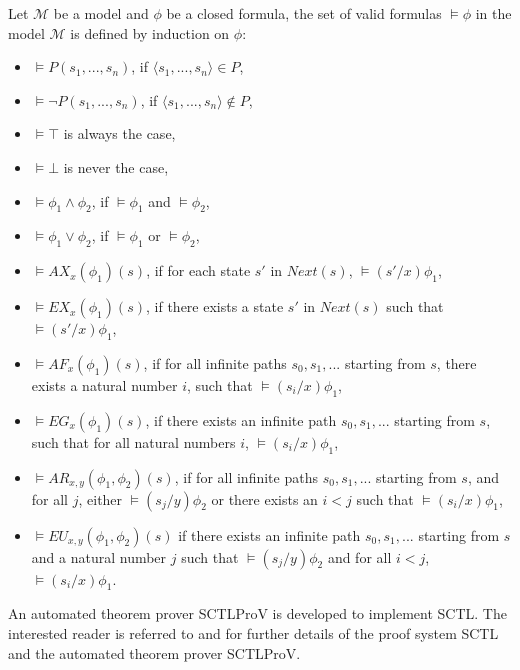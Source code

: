 \documentclass[runningheads]{llncs}
\begin{document}
\begin{definition}
Let $\mathcal{M}$ be a model and $\phi$ be a closed formula, the set of valid formulas $\models \phi$ in the model $\mathcal{M}$ is defined by induction on $\phi$:
 
\begin{itemize}
        \item $\models P(s_1,...,s_n)$, if $\langle s_1,...,s_n\rangle \in P$,
        \item $\models \neg P(s_1,...,s_n)$, if $\langle s_1,...,s_n\rangle \notin P$,
        \item $\models \top$ is always the case, 
        \item $\models \bot$ is never the case,
        \item $\models \phi_1\wedge\phi_2$, if $\models \phi_1$ and $\models \phi_2$,
        \item $\models \phi_1\vee\phi_2$, if $\models \phi_1$ or $\models \phi_2$,
        \item $\models AX_x(\phi_1)(s)$, if for each state $s'$ in $Next(s)$, $\models (s'/x)\phi_1$,
        \item $\models EX_x(\phi_1)(s)$, if there exists a state $s'$ in $Next(s)$ such that $\models (s'/x)\phi_1$,
        \item $\models AF_x(\phi_1)(s)$, if for all infinite paths $s_0,s_1,...$ starting from $s$, there exists a natural number $i$, such that $\models (s_i/x)\phi_1$,
        \item $\models EG_x(\phi_1)(s)$, if there exists an infinite path $s_0,s_1,...$ starting from $s$, such that for all natural numbers $i$, $\models (s_i/x)\phi_1$,
        \item $\models AR_{x, y}(\phi_1,\phi_2)(s)$, if for all infinite paths $s_0,s_1,...$ starting from $s$, and for all $j$, either $\models (s_j/y)\phi_2$ or there exists an $i<j$ such that $\models (s_i/x)\phi_1$,
        \item $\models EU_{x, y}(\phi_1,\phi_2)(s)$ if there exists an infinite path $s_0,s_1,...$ starting from $s$ and a natural number $j$ such that $\models (s_j/y)\phi_2$ and for all $i<j$, $\models (s_i/x)\phi_1$.
\end{itemize}
\end{definition}
 
An automated theorem prover \textsf{SCTLProV} is developed to implement \textsf{SCTL}.
The interested reader is referred to \cite{dowek2013logical} and \cite{LiuDJJ16} for further details of the proof system \textsf{SCTL} and the automated theorem prover \textsf{SCTLProV}.
 
\end{document}
